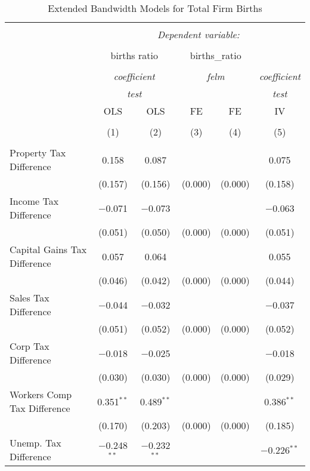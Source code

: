 
\begin{table}[!htbp] \centering 
  \caption{Extended Bandwidth Models for  Total Firm Births} 
  \label{} 
\begin{tabular}{@{\extracolsep{5pt}}lccccc} 
\\[-1.8ex]\hline 
\hline \\[-1.8ex] 
 & \multicolumn{5}{c}{\textit{Dependent variable:}} \\ 
\cline{2-6} 
\\[-1.8ex] & \multicolumn{2}{c}{births ratio} & \multicolumn{2}{c}{births\_ratio} &   \\ 
\\[-1.8ex] & \multicolumn{2}{c}{\textit{coefficient}} & \multicolumn{2}{c}{\textit{felm}} & \textit{coefficient} \\ 
 & \multicolumn{2}{c}{\textit{test}} & \multicolumn{2}{c}{\textit{}} & \textit{test} \\ 
 & OLS & OLS & FE & FE & IV \\ 
\\[-1.8ex] & (1) & (2) & (3) & (4) & (5)\\ 
\hline \\[-1.8ex] 
 Property Tax Difference & 0.158 & 0.087 &  &  & 0.075 \\ 
  & (0.157) & (0.156) & (0.000) & (0.000) & (0.158) \\ 
  Income Tax Difference & $-$0.071 & $-$0.073 &  &  & $-$0.063 \\ 
  & (0.051) & (0.050) & (0.000) & (0.000) & (0.051) \\ 
  Capital Gains Tax Difference & 0.057 & 0.064 &  &  & 0.055 \\ 
  & (0.046) & (0.042) & (0.000) & (0.000) & (0.044) \\ 
  Sales Tax Difference & $-$0.044 & $-$0.032 &  &  & $-$0.037 \\ 
  & (0.051) & (0.052) & (0.000) & (0.000) & (0.052) \\ 
  Corp Tax Difference & $-$0.018 & $-$0.025 &  &  & $-$0.018 \\ 
  & (0.030) & (0.030) & (0.000) & (0.000) & (0.029) \\ 
  Workers Comp Tax Difference & 0.351$^{**}$ & 0.489$^{**}$ &  &  & 0.386$^{**}$ \\ 
  & (0.170) & (0.203) & (0.000) & (0.000) & (0.185) \\ 
  Unemp. Tax Difference & $-$0.248$^{**}$ & $-$0.232$^{**}$ &  &  & $-$0.226$^{**}$ \\ 

\end{tabular}
\end{table}
